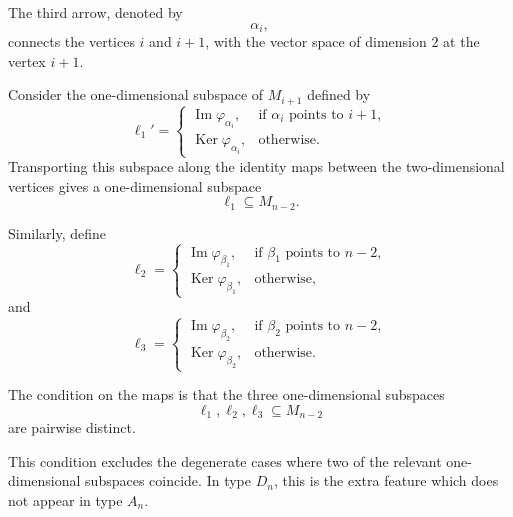 \documentclass[11pt, a4paper]{report}
\begin{document}
The third arrow, denoted by
\[
    \alpha_i,
\]
connects the vertices \(i\) and \(i+1\), with the vector space of dimension \(2\)
at the vertex \(i+1\).

Consider the one-dimensional subspace of \(M_{i+1}\) defined by
\[
    \ell_1'=
    \begin{cases}
        \operatorname{Im}\varphi_{\alpha_i},
        & \text{if } \alpha_i \text{ points to } i+1,\\[1mm]
        \operatorname{Ker}\varphi_{\alpha_i},
        & \text{otherwise}.
    \end{cases}
\]
Transporting this subspace along the identity maps between the two-dimensional
vertices gives a one-dimensional subspace
\[
    \ell_1\subseteq M_{n-2}.
\]

Similarly, define
\[
    \ell_2=
    \begin{cases}
        \operatorname{Im}\varphi_{\beta_1},
        & \text{if } \beta_1 \text{ points to } n-2,\\[1mm]
        \operatorname{Ker}\varphi_{\beta_1},
        & \text{otherwise},
    \end{cases}
\]
and
\[
    \ell_3=
    \begin{cases}
        \operatorname{Im}\varphi_{\beta_2},
        & \text{if } \beta_2 \text{ points to } n-2,\\[1mm]
        \operatorname{Ker}\varphi_{\beta_2},
        & \text{otherwise}.
    \end{cases}
\]

The condition on the maps is that the three one-dimensional subspaces
\[
    \ell_1,\ell_2,\ell_3\subseteq M_{n-2}
\]
are pairwise distinct.

\begin{remark}
    This condition excludes the degenerate cases where two of the relevant
    one-dimensional subspaces coincide. In type \(D_n\), this is the extra feature
    which does not appear in type \(A_n\).
\end{remark}
\end{document}
